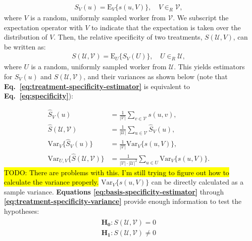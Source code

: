 \documentclass[a4paper]{report}
\newcommand{\td}[1]{{\color{blu}\hl{TODO: #1}}}
\begin{document}
\begin{align}
	S_V(u) =  \text{E}_V\{s(u,V)\}, \quad V \in_R \mathcal{V},
		\label{eq:basis-specificity}
\end{align}
where $V$ is a random, uniformly sampled worker from $\mathcal{V}$.  We 
subscript the expectation operator with $V$ to indicate 
that the expectation is taken over the distribution of $V$.  Then, the 
relative specificity of two treatments, $S(\mathcal{U},{V})$, can be 
written as:
\begin{align}
	S(\mathcal{U},\mathcal{V}) = 
		\text{E}_U\{S_V(U)\}, \quad U \in_R \mathcal{U},
		\label{eq:treatment-specificity}
\end{align}
where $U$ is a random, uniformly sampled worker from $\mathcal{U}$.  This 
yields 
estimators for $S_V(u)$ and $S(\mathcal{U}, \mathcal{V})$, and their variances
as shown below (note that 
\textbf{Eq.~\ref{eq:treatment-specificity-estimator}} is
equivalent to \textbf{Eq.~\ref{eq:specificity}}):

\begin{align}
	\hat{S}_V(u) &= \frac{1}{|\mathcal{V}|} \sum_{v \in \mathcal{V}} s(u,v), 
		\label{eq:basis-specificity-estimator} \\
		\hat{S}(\mathcal{U},\mathcal{V}) 
		&= \frac{1}{|\mathcal{U}|} \sum_{u \in \mathcal{V}} \hat{S}_V(u),
		\label{eq:treatment-specificity-estimator} \\
		\text{Var}_V\{\hat{S}_V(u)\} 
			&= \frac{1}{|\mathcal{V}|}\text{Var}_V\{s(u,V)\},
		\label{eq:basis-specificity-variance} \\
		\text{Var}_{U,V}\{\hat{S}(\mathcal{U},\mathcal{V})\} 
			&= \frac{1}{|\mathcal{V}|\cdot|\mathcal{U}|^2} 
			\sum_{u\in U}\text{Var}_V\{{s}(u,V)\}.
		\label{eq:treatment-specificity-variance}
\end{align}
\td{There are problems with this.  I'm still trying to figure out how to
	calculate the variance properly.}
$\text{Var}_V\{s(u,V)\}$ can be directly calculated as a sample variance.
\textbf{Equations \ref{eq:basis-specificity-estimator}} through 
\textbf{\ref{eq:treatment-specificity-variance}} provide enough information to test the hypotheses:
\begin{align}
	\begin{matrix}
		\mathbf{H_0}: S(\mathcal{U}, \mathcal{V}) = 0 \\[0.5em]
		\mathbf{H_1}: S(\mathcal{U}, \mathcal{V}) \neq 0
	\end{matrix}
\end{align}
\end{document}
